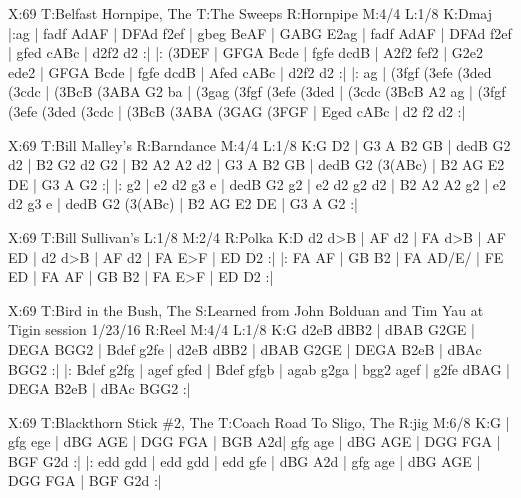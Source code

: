 \documentclass[letterpaper]{article}
\begin{document}
\begin{abc}[name]
X:69
T:Belfast Hornpipe, The
T:The Sweeps
R:Hornpipe
M:4/4
L:1/8
K:Dmaj
|:ag | fadf AdAF | DFAd f2ef | gbeg BeAF | GABG E2ag |
fadf AdAF | DFAd f2ef | gfed cABc | d2f2 d2 :|
|: (3DEF | GFGA Bcde | fgfe dcdB | A2f2 fef2 | G2e2 ede2 |
GFGA Bcde | fgfe dcdB | Afed cABc | d2f2 d2 :|
|: ag | (3fgf (3efe (3ded (3cdc | (3BcB (3ABA G2 ba | (3gag (3fgf (3efe (3ded | (3cdc (3BcB A2 ag |
(3fgf (3efe (3ded (3cdc | (3BcB (3ABA (3GAG (3FGF | Eged cABc | d2 f2 d2 :|
\end{abc}

\begin{abc}[name]
X:69
T:Bill Malley's
R:Barndance
M:4/4
L:1/8
K:G
D2 | G3 A B2 GB | dedB G2 d2 | B2 G2 d2 G2 | B2 A2 A2 d2 |
G3 A B2 GB | dedB G2 (3(ABc) | B2 AG E2 DE | G3 A G2 :|
|: g2 | e2 d2 g3 e | dedB G2 g2 | e2 d2 g2 d2 | B2 A2 A2 g2 |
e2 d2 g3 e | dedB G2 (3(ABc) | B2 AG E2 DE | G3 A G2 :|
\end{abc}

\begin{abc}[name]
X:69
T:Bill Sullivan's
L:1/8
M:2/4
R:Polka
K:D
d2 d>B | AF d2 | FA d>B | AF ED |
d2 d>B | AF d2 | FA E>F | ED D2 :|
|: FA AF | GB B2 | FA AD/E/ | FE ED |
FA AF | GB B2 | FA E>F | ED D2 :|
\end{abc}

\begin{abc}[name]
X:69
T:Bird in the Bush, The
S:Learned from John Bolduan and Tim Yau at Tigin session 1/23/16
R:Reel
M:4/4
L:1/8
K:G
d2eB dBB2 | dBAB G2GE | DEGA BGG2 | Bdef g2fe |
d2eB dBB2 | dBAB G2GE | DEGA B2eB | dBAc BGG2 :|
|: Bdef g2fg | agef gfed | Bdef gfgb | agab g2ga |
bgg2 agef | g2fe dBAG | DEGA B2eB | dBAc BGG2 :|
\end{abc}

\begin{abc}[name]
X:69
T:Blackthorn Stick \#2, The
T:Coach Road To Sligo, The
R:jig
M:6/8
K:G
| gfg ege | dBG AGE | DGG FGA | BGB A2d|
gfg age | dBG AGE | DGG FGA | BGF G2d :|
|: edd gdd | edd gdd | edd gfe | dBG A2d |
gfg age | dBG AGE | DGG FGA | BGF G2d :|
\end{abc}
\end{document}
